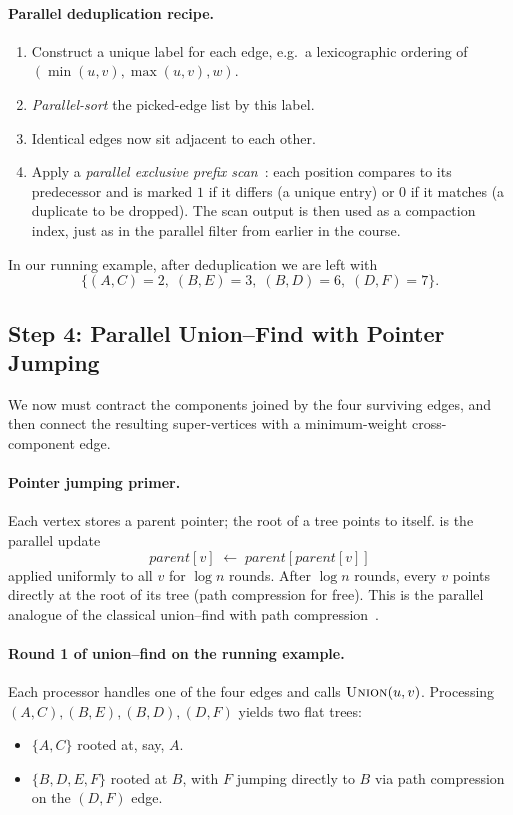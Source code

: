 \paragraph{Parallel deduplication recipe.}
\begin{enumerate}
  \item Construct a unique label for each edge, e.g.\ a lexicographic
        ordering of $(\min(u,v), \max(u,v), w)$.
  \item \emph{Parallel-sort} the picked-edge list by this label.
  \item Identical edges now sit adjacent to each other.
  \item Apply a \emph{parallel exclusive prefix scan}~\cite{blelloch1996}: each position
        compares to its predecessor and is marked $1$ if it differs
        (a unique entry) or $0$ if it matches (a duplicate to be
        dropped).  The scan output is then used as a compaction
        index, just as in the parallel filter from earlier in the
        course.
\end{enumerate}

In our running example, after deduplication we are left with
\[
  \{(A,C){=}2,\; (B,E){=}3,\; (B,D){=}6,\; (D,F){=}7\}.
\]

\subsection{Step 4: Parallel Union--Find with Pointer Jumping}

We now must contract the components joined by the four surviving
edges, and then connect the resulting super-vertices with a
minimum-weight cross-component edge.

\paragraph{Pointer jumping primer.}
Each vertex stores a parent pointer; the root of a tree points to
itself.   is the parallel update
\[
  \mathit{parent}[v] \;\leftarrow\; \mathit{parent}[\mathit{parent}[v]]
\]
applied uniformly to all $v$ for $\log n$ rounds.  After $\log n$
rounds, every $v$ points directly at the root of its tree (path
compression for free).  This is the parallel analogue of the
classical union--find with path compression~\cite{jaja1992}.

\paragraph{Round 1 of union--find on the running example.}
Each processor handles one of the four edges and calls
$\textsc{Union}(u, v)$.  Processing $(A,C), (B,E), (B,D), (D,F)$
yields two flat trees:
\begin{itemize}
  \item $\{A, C\}$ rooted at, say, $A$.
  \item $\{B, D, E, F\}$ rooted at $B$, with $F$ jumping directly to
        $B$ via path compression on the $(D,F)$ edge.
\end{itemize}

